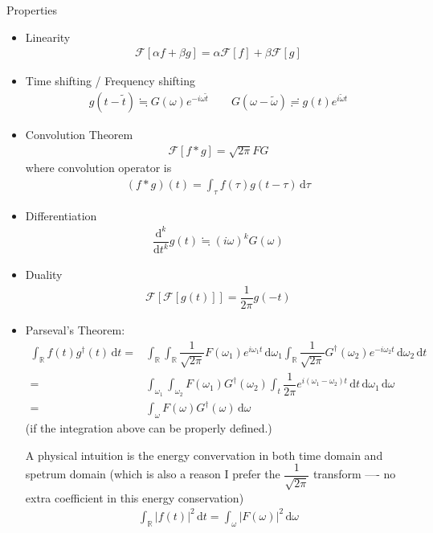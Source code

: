 Properties
\begin{itemize}[topsep=2pt,itemsep=0pt]
    \item Linearity
    \begin{align}
        \mathscr{F}\left[ \alpha f+\beta g \right] = \alpha \mathscr{F}\left[ f \right] +\beta \mathscr{F}\left[ g \right]  
    \end{align}
    \item Time shifting / Frequency shifting
    \begin{align}
        g(t-\tilde{t})\fallingdotseq G(\omega )e^{-i\omega \tilde{t}}  \qquad G(\omega -\tilde{\omega })\risingdotseq g(t)e^{i\tilde{\omega }t}
    \end{align}
    \item Convolution Theorem
    \begin{align}
        \mathscr{F}\left[ f*g \right]  = \sqrt{2\pi} FG 
    \end{align}
    where convolution operator is
    \begin{align}
        (f*g)(t)=\int _\tau f(\tau)g(t-\tau) \,\mathrm{d}\tau
    \end{align}
    \item Differentiation
    \begin{align}
        \dfrac{\mathrm{d}^{k} }{\mathrm{d}t^{k}} g(t) \fallingdotseq (i\omega )^k G(\omega )
    \end{align}
    \item Duality
    \begin{align}
        \mathscr{F}\left[ \mathscr{F}\left[ g(t) \right]  \right] = \dfrac{1}{2\pi} g(-t)  
    \end{align}
    \item Parseval's Theorem:
    \begin{align}\label{EqaParsevalThm}
        \int _\mathbb{R}f(t)g^\dagger (t) \,\mathrm{d}t =& \int _\mathbb{R} \int _\mathbb{R}\dfrac{1}{\sqrt{2\pi}}F(\omega _1)e^{i\omega _1t} \,\mathrm{d}\omega _1 \int _\mathbb{R}\dfrac{1}{\sqrt{2\pi}}G^\dagger(\omega _2)e^{-i\omega _2t} \,\mathrm{d}\omega _2 \,\mathrm{d}t\\
        =&\int_{\omega _1} \int_{ \omega _2} F(\omega _1)G^\dagger(\omega _2)\int _t \dfrac{1}{2\pi} e^{i(\omega _1-\omega _2)t} \,\mathrm{d}t \,\mathrm{d}\omega _1 \,\mathrm{d}\omega\\
        =&\int_\omega F(\omega )G^\dagger(\omega )\,\mathrm{d}\omega
    \end{align}
    (if the integration above can be properly defined.)

    A physical intuition is the energy convervation in both time domain and spetrum domain (which is also a reason I prefer the $ \dfrac{1}{\sqrt{2\pi}} $ transform ---- no extra coefficient in this energy conservation)
    \begin{align}
        \int_{\mathbb{R}} \left| f(t) \right|^2\,\mathrm{d}t = \int_\omega \left|F(\omega )\right|^2 \,\mathrm{d}\omega 
    \end{align}
    
       
    
\end{itemize}


